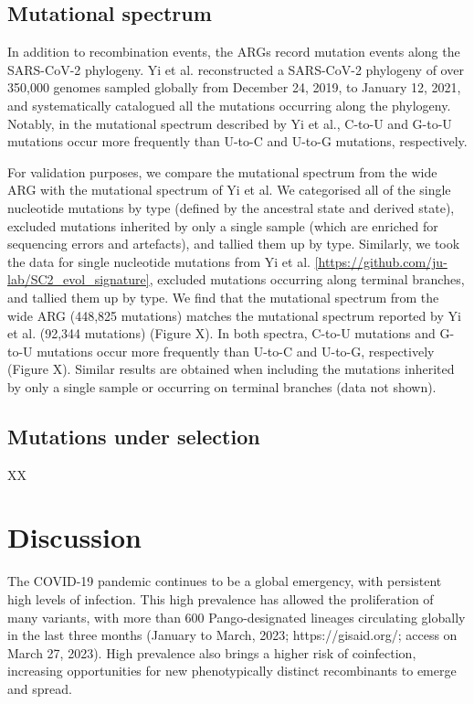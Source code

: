 \documentclass{article}
\begin{document}
\subsection{Mutational spectrum}

In addition to recombination events, the ARGs record mutation events along the SARS-CoV-2 phylogeny. Yi et al. \cite{Yi2021-sc} reconstructed a SARS-CoV-2 phylogeny of over 350,000 genomes sampled globally from December 24, 2019, to January 12, 2021, and systematically catalogued all the mutations occurring along the phylogeny. Notably, in the mutational spectrum described by Yi et al., C-to-U and G-to-U mutations occur more frequently than U-to-C and U-to-G mutations, respectively.

For validation purposes, we compare the mutational spectrum from the wide ARG with the mutational spectrum of Yi et al. We categorised all of the single nucleotide mutations by type (defined by the ancestral state and derived state), excluded mutations inherited by only a single sample (which are enriched for sequencing errors and artefacts), and tallied them up by type. Similarly, we took the data for single nucleotide mutations from Yi et al. \ref{https://github.com/ju-lab/SC2_evol_signature}, excluded mutations occurring along terminal branches, and tallied them up by type. We find that the mutational spectrum from the wide ARG (448,825 mutations) matches the mutational spectrum reported by Yi et al. (92,344 mutations) (Figure X). In both spectra, C-to-U mutations and G-to-U mutations occur more frequently than U-to-C and U-to-G, respectively (Figure X). Similar results are obtained when including the mutations inherited by only a single sample or occurring on terminal branches (data not shown).

\subsection{Mutations under selection}

XX

\section{Discussion}

The COVID-19 pandemic continues to be a global emergency, with persistent high levels of infection. This high prevalence has allowed the proliferation of many variants, with more than 600 Pango-designated lineages circulating globally in the last three months (January to March, 2023; https://gisaid.org/; access on March 27, 2023). High prevalence also brings a higher risk of coinfection, increasing opportunities for new phenotypically distinct recombinants to emerge and spread.
\end{document}
